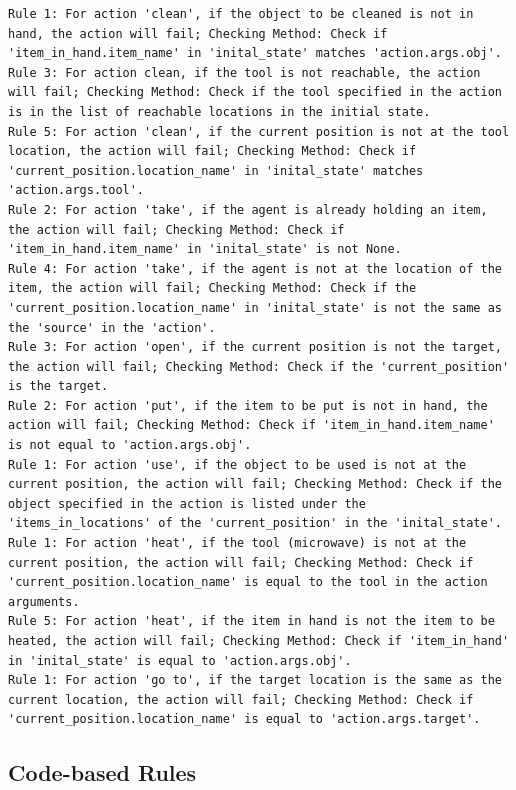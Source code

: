 \documentclass{article} %
\begin{document}
\lstset{language=}
\begin{lstlisting}
Rule 1: For action 'clean', if the object to be cleaned is not in hand, the action will fail; Checking Method: Check if 'item_in_hand.item_name' in 'inital_state' matches 'action.args.obj'. 
Rule 3: For action clean, if the tool is not reachable, the action will fail; Checking Method: Check if the tool specified in the action is in the list of reachable locations in the initial state. 
Rule 5: For action 'clean', if the current position is not at the tool location, the action will fail; Checking Method: Check if 'current_position.location_name' in 'inital_state' matches 'action.args.tool'. 
Rule 2: For action 'take', if the agent is already holding an item, the action will fail; Checking Method: Check if 'item_in_hand.item_name' in 'inital_state' is not None. 
Rule 4: For action 'take', if the agent is not at the location of the item, the action will fail; Checking Method: Check if the 'current_position.location_name' in 'inital_state' is not the same as the 'source' in the 'action'. 
Rule 3: For action 'open', if the current position is not the target, the action will fail; Checking Method: Check if the 'current_position' is the target. 
Rule 2: For action 'put', if the item to be put is not in hand, the action will fail; Checking Method: Check if 'item_in_hand.item_name' is not equal to 'action.args.obj'. 
Rule 1: For action 'use', if the object to be used is not at the current position, the action will fail; Checking Method: Check if the object specified in the action is listed under the 'items_in_locations' of the 'current_position' in the 'inital_state'. 
Rule 1: For action 'heat', if the tool (microwave) is not at the current position, the action will fail; Checking Method: Check if 'current_position.location_name' is equal to the tool in the action arguments. 
Rule 5: For action 'heat', if the item in hand is not the item to be heated, the action will fail; Checking Method: Check if 'item_in_hand' in 'inital_state' is equal to 'action.args.obj'. 
Rule 1: For action 'go to', if the target location is the same as the current location, the action will fail; Checking Method: Check if 'current_position.location_name' is equal to 'action.args.target'. 
\end{lstlisting}


\subsection{Code-based Rules}
\label{sec:Code-based Rules}
\end{document}
